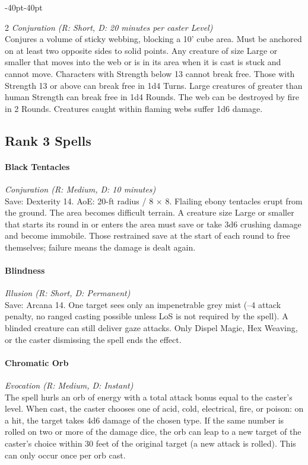 \documentclass{book}
\begin{document}
\begin{adjustwidth}{-40pt}{-40pt}
\begin{multicols}{2}
\emph{Conjuration (R: Short, D: 20 minutes per caster Level)}\\
Conjures a volume of sticky webbing, blocking a 10' cube area. Must be
anchored on at least two opposite sides to solid points. Any creature of
size Large or smaller that moves into the web or is in its area when it
is cast is stuck and cannot move. Characters with Strength below 13
cannot break free. Those with Strength 13 or above can break free in 1d4
Turns. Large creatures of greater than human Strength can break free in
1d4 Rounds. The web can be destroyed by fire in 2 Rounds. Creatures
caught within flaming webs suffer 1d6 damage.

\subsection*{Rank 3 Spells}\label{rank-3-spells}

\paragraph{Black Tentacles}\label{black-tentacles}

\emph{Conjuration (R: Medium, D: 10 minutes)}\\
Save: Dexterity 14. AoE: 20-ft radius / 8 × 8. Flailing ebony tentacles
erupt from the ground. The area becomes difficult terrain. A creature
size Large or smaller that starts its round in or enters the area must
save or take 3d6 crushing damage and become immobile. Those restrained
save at the start of each round to free themselves; failure means the
damage is dealt again.

\paragraph{Blindness}\label{blindness}

\emph{Illusion (R: Short, D: Permanent)}\\
Save: Arcana 14. One target sees only an impenetrable grey mist (--4
attack penalty, no ranged casting possible unless LoS is not required by
the spell). A blinded creature can still deliver gaze attacks. Only
Dispel Magic, Hex Weaving, or the caster dismissing the spell ends the
effect.

\paragraph{Chromatic Orb}\label{chromatic-orb}

\emph{Evocation (R: Medium, D: Instant)}\\
The spell hurls an orb of energy with a total attack bonus equal to the
caster's level. When cast, the caster chooses one of acid, cold,
electrical, fire, or poison: on a hit, the target takes 4d6 damage of
the chosen type. If the same number is rolled on two or more of the
damage dice, the orb can leap to a new target of the caster's choice
within 30 feet of the original target (a new attack is rolled). This can
only occur once per orb cast.


\end{multicols}
\end{adjustwidth}
\end{document}
